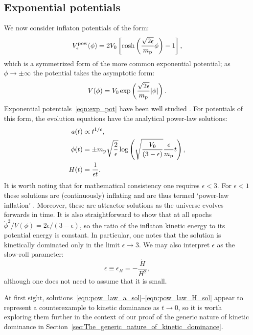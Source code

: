 \subsection{Exponential potentials}
\label{sec:Exponential_potentials}
We now consider inflaton potentials of the form:
%
\begin{equation}
  V^\mathrm{pow}_\epsilon(\phi) 
  = 
  2V_0\left[
  \cosh\left(\frac{\sqrt{2\epsilon}}{m_{\mathrm{p}}}\phi\right)-1
  \right],
  \label{eqn:coshpot}
\end{equation}
%
which is a symmetrized form of the more common exponential potential; as \(\phi\rightarrow\pm\infty\) the potential takes the asymptotic form:
%
\begin{equation}
  V(\phi) 
  = 
  V_0 \exp\left(\frac{\sqrt{2\epsilon}}{m_{\mathrm{p}}} |\phi|\right).
  \label{eqn:exp_pot}
\end{equation}
%
Exponential potentials~\eqref{eqn:exp_pot} have been well studied \citep{yokoyama_dynamics_1988}. For potentials of this form, the evolution equations have the analytical power-law solutions:
%
\begin{align}
  a(t) 
  &\propto 
  {t}^{1/\epsilon},
  \label{eqn:pow_law_a_sol}
  \\
  \phi(t)
  &=
  \pm m_{\mathrm{p}}\sqrt{\frac{2}{\epsilon}}
  \log\left(\sqrt{\frac{V_0}{\left(3-\epsilon\right)}}
  \frac{\epsilon}{m_{\mathrm{p}}} t\right),
  \\
  H(t)
  &=
  \frac{1}{\epsilon t}.  
  \label{eqn:pow_law_H_sol}
\end{align}
%
It is worth noting that for mathematical consistency one requires \(\epsilon < 3\). For \(\epsilon<1\) these solutions are (continuously) inflating and are thus termed `power-law inflation' \citep{lucchin_power-law_1985}. Moreover, these are attractor solutions as the universe evolves forwards in time. It is also straightforward to show that at all epochs \(\dot{\phi}^2/V(\phi) = 2\epsilon/(3-\epsilon)\), so the ratio of the inflaton kinetic energy to its potential energy is constant. In particular, one notes that the solution is kinetically dominated only in the limit \(\epsilon \to 3\).  We may also interpret \(\epsilon\) as the slow-roll parameter:
%
\begin{equation}
  \epsilon\equiv\epsilon_H = -\frac{\dot{H}}{H^2},
\end{equation}
%
although one does not need to assume that it is small.

At first sight, solutions~\eqref{eqn:pow_law_a_sol}--\eqref{eqn:pow_law_H_sol} appear to represent a counterexample to kinetic dominance as \(t \to 0\), so it is worth exploring them further in the context of our proof of the generic nature of kinetic dominance in Section~\ref{sec:The_generic_nature_of_kinetic_dominance}. 

